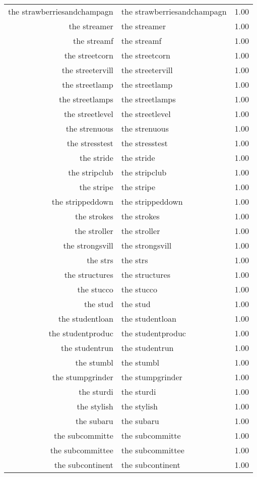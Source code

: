 \begin{table}[ht]
\begin{tabular}{rlr}
  the strawberriesandchampagn & the strawberriesandchampagn & 1.00 \\ 
  the streamer & the streamer & 1.00 \\ 
  the streamf & the streamf & 1.00 \\ 
  the streetcorn & the streetcorn & 1.00 \\ 
  the streetervill & the streetervill & 1.00 \\ 
  the streetlamp & the streetlamp & 1.00 \\ 
  the streetlamps & the streetlamps & 1.00 \\ 
  the streetlevel & the streetlevel & 1.00 \\ 
  the strenuous & the strenuous & 1.00 \\ 
  the stresstest & the stresstest & 1.00 \\ 
  the stride & the stride & 1.00 \\ 
  the stripclub & the stripclub & 1.00 \\ 
  the stripe & the stripe & 1.00 \\ 
  the strippeddown & the strippeddown & 1.00 \\ 
  the strokes & the strokes & 1.00 \\ 
  the stroller & the stroller & 1.00 \\ 
  the strongsvill & the strongsvill & 1.00 \\ 
  the strs & the strs & 1.00 \\ 
  the structures & the structures & 1.00 \\ 
  the stucco & the stucco & 1.00 \\ 
  the stud & the stud & 1.00 \\ 
  the studentloan & the studentloan & 1.00 \\ 
  the studentproduc & the studentproduc & 1.00 \\ 
  the studentrun & the studentrun & 1.00 \\ 
  the stumbl & the stumbl & 1.00 \\ 
  the stumpgrinder & the stumpgrinder & 1.00 \\ 
  the sturdi & the sturdi & 1.00 \\ 
  the stylish & the stylish & 1.00 \\ 
  the subaru & the subaru & 1.00 \\ 
  the subcommitte & the subcommitte & 1.00 \\ 
  the subcommittee & the subcommittee & 1.00 \\ 
  the subcontinent & the subcontinent & 1.00 \\ 

\end{tabular}
\end{table}
